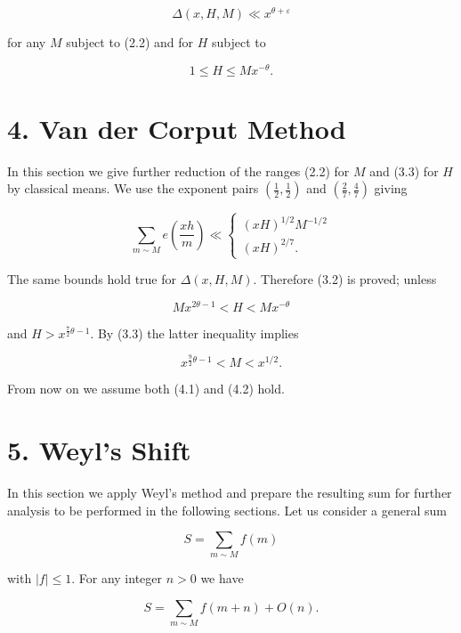 \documentclass[10pt]{article}
\begin{document}
\begin{equation*}
\Delta(x, H, M) \ll x^{\theta+\varepsilon} \tag{3.2}
\end{equation*}


for any $M$ subject to (2.2) and for $H$ subject to


\begin{equation*}
1 \leqslant H \leqslant M x^{-\theta} . \tag{3.3}
\end{equation*}


\section*{4. Van der Corput Method}
In this section we give further reduction of the ranges (2.2) for $M$ and (3.3) for $H$ by classical means. We use the exponent pairs $\left(\frac{1}{2}, \frac{1}{2}\right)$ and $\left(\frac{2}{7}, \frac{4}{7}\right)$ giving

$$
\sum_{m \sim M} e\left(\frac{x h}{m}\right) \ll\left\{\begin{array}{l}
(x H)^{1 / 2} M^{-1 / 2} \\
(x H)^{2 / 7} .
\end{array}\right.
$$

The same bounds hold true for $\Delta(x, H, M)$. Therefore (3.2) is proved; unless


\begin{equation*}
Mx^{2\theta-1}<H<Mx^{-\theta} \tag{4.1}
\end{equation*}


and $H>x^{\frac{7}{2} \theta-1}$. By (3.3) the latter inequality implies


\begin{equation*}
x^{\frac{9}{2} \theta-1}<M<x^{1 / 2} . \tag{4.2}
\end{equation*}


From now on we assume both (4.1) and (4.2) hold.

\section*{5. Weyl's Shift}
In this section we apply Weyl's method and prepare the resulting sum for further analysis to be performed in the following sections. Let us consider a general sum

$$
S=\sum_{m \sim M} f(m)
$$

with $|f| \leqslant 1$. For any integer $n>0$ we have

$$
S=\sum_{m \sim M} f(m+n)+O(n) .
$$
\end{document}

